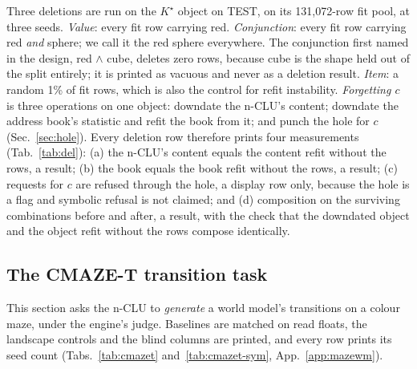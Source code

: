 \documentclass{article} %
\newcommand{\Kstar}{\ensuremath{K^{\star}}}
\begin{document}
Three deletions are run on the $\Kstar$ object on TEST, on its 131,072-row fit pool, at three %
seeds. \emph{Value}: every fit row carrying red. \emph{Conjunction}: every fit row carrying red
\emph{and} sphere; we call it the red sphere everywhere. The conjunction first named in the design,
red $\wedge$ cube, deletes zero rows, because cube is the shape held out of the split entirely; it is
printed as vacuous and never as a deletion result. \emph{Item}: a random 1\% of fit rows, which is
also the control for refit instability. \emph{Forgetting $c$} is three operations on one object:
downdate the n-CLU's content; downdate the address book's statistic and refit the book from it; and punch the
hole for $c$ (Sec.~\ref{sec:hole}). Every deletion row therefore prints four measurements
(Tab.~\ref{tab:del}): (a) the n-CLU's content equals the content refit without the rows, a result; (b) the book
equals the book refit without the rows, a result; (c) requests for $c$ are refused through the hole,
a display row only, because the hole is a flag and symbolic refusal is not claimed; and (d)
composition on the surviving combinations before and after, a result, with the check that the downdated
object and the object refit without the rows compose identically.

\subsection{The CMAZE-T transition task}
\label{sec:maze}

This section asks the n-CLU to \emph{generate} a world model's transitions on a colour maze, under
the engine's judge. Baselines are matched on read floats, the landscape controls and the blind columns
are printed, and every row prints its seed count (Tabs.~\ref{tab:cmazet} and~\ref{tab:cmazet-sym},
App.~\ref{app:mazewm}).
\end{document}
